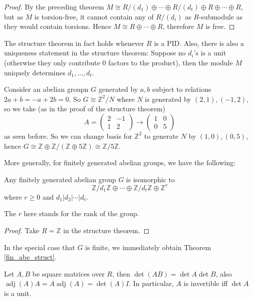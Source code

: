 \begin{proof}
    By the preceding theorem $M\cong R/(d_1)\oplus\cdots\oplus R/(d_t)\oplus R\oplus\cdots\oplus R$, but as $M$ is torsion-free, it cannot contain any of $R/(d_i)$ as $R$-submodule as they would contain torsions.
    Hence $M\cong R\oplus\cdots\oplus R$, therefore $M$ is free.
\end{proof}
\begin{remark}
    The structure theorem in fact holds whenever $R$ is a PID.
    Also, there is also a uniqueness statement in the structure theorem: Suppose no $d_i$'s is a unit (otherwise they only contribute $0$ factors to the product), then the module $M$ uniquely determines $d_1,\ldots,d_t$.
\end{remark}
\begin{example}
    Consider an abelian groupn $G$ generated by $a,b$ subject to relations $2a+b=-a+2b=0$.
    So $G\cong\mathbb Z^2/N$ where $N$ is generated by $(2,1),(-1,2)$, so we take (as in the proof of the structure theorem)
    $$A=\begin{pmatrix}
        2&-1\\
        1&2
    \end{pmatrix}\to\begin{pmatrix}
        1&0\\
        0&5
    \end{pmatrix}$$
    as seen before.
    So we can change basis for $\mathbb Z^2$ to generate $N$ by $(1,0),(0,5)$, hence $G\cong\mathbb Z\oplus\mathbb Z/(\mathbb Z\oplus 5\mathbb Z)\cong\mathbb Z/5\mathbb Z$.
\end{example}
More generally, for finitely generated abelian groups, we have the following:
\begin{theorem}
    Any finitely generated abelian group $G$ is isomorphic to
    $$\mathbb Z/d_1\mathbb Z\oplus\cdots\oplus\mathbb Z/d_t\mathbb Z\oplus\mathbb Z^r$$
    where $r\ge 0$ and $d_1|d_2|\cdots|d_t$.
\end{theorem}
The $r$ here stands for the rank of the group.
\begin{proof}
    Take $R=\mathbb Z$ in the structure theorem.
\end{proof}
In the special case that $G$ is finite, we immediately obtain Theorem \ref{fin_abe_struct}.
\begin{remark}
    Let $A,B$ be square matrices over $R$, then $\det (AB)=\det A\det B$, also $\operatorname{adj}(A)A=A\operatorname{adj}(A)=\det(A)I$.
    In particular, $A$ is invertible iff $\det A$ is a unit.
\end{remark}
